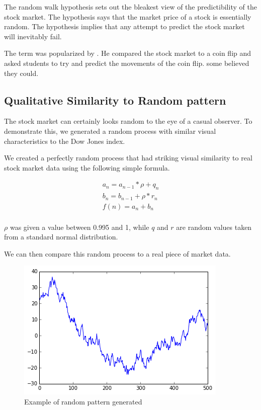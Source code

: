 \documentclass{report}
\begin{document}
The random walk hypothesis sets out the bleakest view of the predictibility of the stock market. The hypothesis says that the market price of a stock is essentially random. The hypothesis implies that any attempt to predict the stock market will inevitably fail. 

The term was popularized by \citet{malkiel1999random}. He compared the stock market to a coin flip and asked students to try and predict the movements of the coin flip. some believed they could.

\subsection{Qualitative Similarity to Random pattern}

The stock market can certainly looks random to the eye of a casual observer. To demonstrate this, we generated a random process with similar visual characteristics to the Dow Jones index.

We created a perfectly random process that had striking visual similarity to real stock market data using the following simple formula.

\begin{align*}
	a_{n} = a_{n-1} * \rho + q_{n}\\
	b_{n} = b_{n-1} + \rho * r_{n}\\
	f(n) = a_{n} + b_{n}\\
\end{align*}

$\rho$ was given a value between 0.995 and 1, while $q$ and $r$ are random values taken from a standard normal distribution.

We can then compare this random process to a real piece of market data.

\begin{figure}[H]
	\caption{Example of random pattern generated}
	\centerline{\includegraphics[width=\textwidth]{vis/random-process.png}}
	\label{fig:random-process}
\end{figure}
\end{document}
